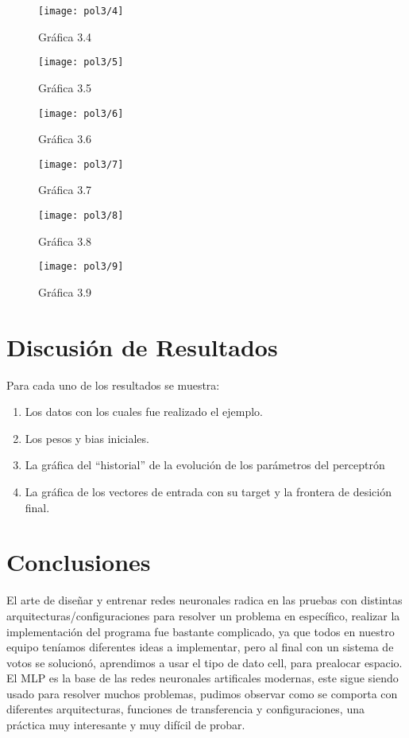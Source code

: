 \documentclass[6pt]{article}
\begin{document}
\begin{figure}[htpb]
	\centering
	\texttt{[image: pol3/4]}
	\caption{Gráfica 3.4}
\end{figure}

\begin{figure}[htpb]
	\centering
	\texttt{[image: pol3/5]}
	\caption{Gráfica 3.5}
\end{figure}

\begin{figure}[htpb]
	\centering
	\texttt{[image: pol3/6]}
	\caption{Gráfica 3.6}
\end{figure}

\begin{figure}[htpb]
	\centering
	\texttt{[image: pol3/7]}
	\caption{Gráfica 3.7}
\end{figure}

\begin{figure}[htpb]
	\centering
	\texttt{[image: pol3/8]}
	\caption{Gráfica 3.8}
\end{figure}

\begin{figure}[htpb]
	\centering
	\texttt{[image: pol3/9]}
	\caption{Gráfica 3.9}
\end{figure}
\newpage
\section{Discusión de Resultados}
Para cada uno de los resultados se muestra:
\begin{enumerate}
	\item Los datos con los cuales fue realizado el ejemplo.
	\item Los pesos y bias iniciales.
	\item La gráfica del ``historial'' de la evolución de los parámetros del perceptrón
	\item La gráfica de los vectores de entrada con su target y la frontera de desición final.
\end{enumerate}
\section{Conclusiones}
El arte de diseñar y entrenar redes neuronales radica en las pruebas con distintas arquitecturas/configuraciones para resolver un problema en específico, realizar la implementación del programa fue bastante complicado, ya que todos en nuestro equipo teníamos diferentes ideas a implementar, pero al final con un sistema de votos se solucionó, aprendimos a usar el tipo de dato cell, para prealocar espacio. El MLP es la base de las redes neuronales artificales modernas, este sigue siendo usado para resolver muchos problemas, pudimos observar como se comporta con diferentes arquitecturas, funciones de transferencia y configuraciones, una práctica muy interesante y muy difícil de probar.
\end{document}
